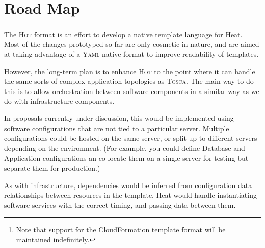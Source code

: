 \section{Road Map}

The \textsc{Hot} format is an effort to develop a native template language for Heat.\footnote{Note that support for the CloudFormation template format will be maintained indefinitely.} Most of the changes prototyped so far are only cosmetic in nature, and are aimed at taking advantage of a \textsc{Yaml}-native format to improve readability of templates.

However, the long-term plan is to enhance \textsc{Hot} to the point where it can handle the same sorts of complex application topologies as \textsc{Tosca}. The main way to do this is to allow orchestration between software components in a similar way as we do with infrastructure components.

In proposals currently under discussion, this would be implemented using software configurations that are not tied to a particular server. Multiple configurations could be hosted on the same server, or split up to different servers depending on the environment. (For example, you could define Database and Application configurations an co-locate them on a single server for testing but separate them for production.)

As with infrastructure, dependencies would be inferred from configuration data relationships between resources in the template. Heat would handle instantiating software services with the correct timing, and passing data between them.
